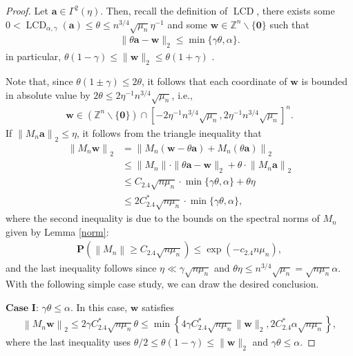 \documentclass{article}
\numberwithin{equation}{section}
\theoremstyle{plain}
\begin{document}
\begin{proof}
Let $\boldsymbol{a} \in \Gamma^2(\eta)$. Then, recall the definition of $\operatorname{LCD}$, there exists some $0< \operatorname{LCD}_{\alpha, \gamma}(\boldsymbol{a})\leq\theta  \leq n^{3 / 4}\sqrt{\mu_{n}} \eta^{-1}$ and some $\boldsymbol{w} \in \mathbb{Z}^n \backslash\{\mathbf{0}\}$ such that
\begin{align*}
\|\theta \boldsymbol{a}-\boldsymbol{w}\|_2 \leq \min \{\gamma \theta, \alpha\}.
\end{align*}
in particular, $\theta(1 - \gamma)\leq\|\boldsymbol{w}\|_2\leq \theta(1 + \gamma)$ .
\par
Note that, since $\theta(1 \pm \gamma) \leq 2 \theta$, it follows that each coordinate of $\boldsymbol{w}$ is bounded in absolute value by $2 \theta \leq 2 \eta^{-1} n^{3 / 4}\sqrt{\mu_{n}}$, i.e.,
\begin{align*}
\boldsymbol{w} \in \left(\mathbb{Z}^n \backslash\{\mathbf{0}\}\right) \cap\left[-2 \eta^{-1} n^{3 / 4}\sqrt{\mu_{n}}, 2 \eta^{-1} n^{3 / 4}\sqrt{\mu_{n}}\right]^n .
\end{align*}
If $\left\|M_n \boldsymbol{a}\right\|_2 \leq \eta$, it follows from the triangle inequality that
\begin{align*}
\left\|M_n \boldsymbol{w}\right\|_2 & =\left\|M_n(\boldsymbol{w}-\theta \boldsymbol{a})+M_n(\theta \boldsymbol{a})\right\|_2 \\
& \leq\left\|M_n\right\| \cdot\|\theta \boldsymbol{a}-\boldsymbol{w}\|_2+\theta \cdot\left\|M_n \boldsymbol{a}\right\|_2 \\
& \leq C_{2.4} \sqrt{n\mu_{n}} \cdot \min \{\gamma \theta, \alpha\}+\theta \eta\\
& \leq 2 C^*_{2.4} \sqrt{n\mu_{n}} \cdot \min \{\gamma \theta, \alpha\},
\end{align*}
where the second inequality is due to the bounds on the spectral norms of $M_n$ given by Lemma \ref{norm}:
\begin{align*}
\textbf{P}\left(\left\|M_n\right\| \geq C_{2.4} \sqrt{n \mu_{n}}\right) \leq \exp \left(-c_{2.4} n \mu_{n}\right), 
\end{align*}
and the last inequality follows since $\eta \ll \gamma \sqrt{n\mu_n}$ and $\theta \eta\leq n^{3 / 4}\sqrt{\mu_{n}}= \sqrt{n\mu_n} \alpha$. With the following simple case study, we can draw the desired conclusion.

$\textbf{Case I}$: $\gamma \theta \leq \alpha$. In this case, $\boldsymbol{w}$ satisfies
\begin{align*}
\left\|M_n \boldsymbol{w}\right\|_2 \leq 2 \gamma C^*_{2.4} \sqrt{n\mu_{n}} \theta \leq \min \left\{4 \gamma C^*_{2.4} \sqrt{n\mu_{n}}\|\boldsymbol{w}\|_2, 2 C^*_{2.4} \alpha \sqrt{n\mu_{n}}\right\},
\end{align*}
where the last inequality uses $\theta / 2 \leq \theta(1-\gamma) \leq\|\boldsymbol{w}\|_2$ and $\gamma \theta \leq \alpha$.


\end{proof}
\end{document}
